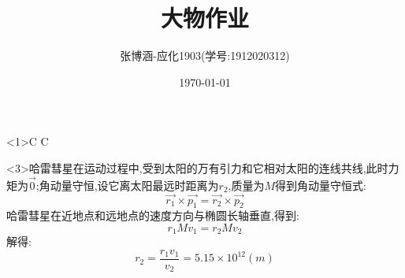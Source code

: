 \documentclass{article}
\title{大物作业}
\author{张博涵-应化1903(学号:1912020312)}
\date{\today}
\begin{document}
	\maketitle
	<1>C \quad <2>C
	
	
	<3>哈雷彗星在运动过程中,受到太阳的万有引力和它相对太阳的连线共线,此时力矩为$\vec{0}$;角动量守恒,设它离太阳最远时距离为$r_2$,质量为$M$得到角动量守恒式:
	$$\vec{r_1}\times\vec{p_1}=\vec{r_2}\times\vec{p_2}$$
	哈雷彗星在近地点和远地点的速度方向与椭圆长轴垂直,得到:
	$$r_1Mv_1=r_2Mv_2$$
	解得:$$r_2=\frac{r_1v_1}{v_2}=5.15\times10^{12}(m)$$
	
	
	
	
	
	
	
\end{document}
